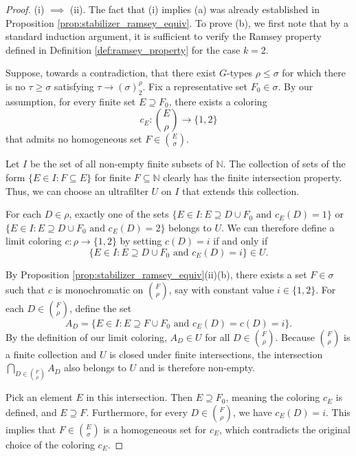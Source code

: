 \begin{proof}
    (i) $\implies$ (ii). The fact that (i) implies (a) was already established in Proposition \ref{prop:stabilizer_ramsey_equiv}. To prove (b), we first note that by a standard induction argument, it is sufficient to verify the Ramsey property defined in Definition \ref{def:ramsey_property} for the case $k=2$.

    Suppose, towards a contradiction, that there exist $G$-types $\rho \le \sigma$ for which there is no $\tau \ge \sigma$ satisfying $\tau \to (\sigma)^\rho_2$. Fix a representative set $F_0 \in \sigma$. By our assumption, for every finite set $E \supseteq F_0$, there exists a coloring
    $$
        c_E: \binom{E}{\rho} \to \{1, 2\}
    $$
    that admits no homogeneous set $F \in \binom{E}{\sigma}$.

    Let $I$ be the set of all non-empty finite subsets of $\mathbb{N}$. The collection of sets of the form $\{E \in I : F \subseteq E\}$ for finite $F \subseteq \mathbb{N}$ clearly has the finite intersection property. Thus, we can choose an ultrafilter $U$ on $I$ that extends this collection.

    For each $D \in \rho$, exactly one of the sets $\{E \in I : E \supseteq D \cup F_0 \text{ and } c_E(D) = 1\}$ or $\{E \in I : E \supseteq D \cup F_0 \text{ and } c_E(D) = 2\}$ belongs to $U$. We can therefore define a limit coloring $c: \rho \to \{1, 2\}$ by setting $c(D) = i$ if and only if
    $$
        \{E \in I : E \supseteq D \cup F_0 \text{ and } c_E(D) = i\} \in U.
    $$

    By Proposition \ref{prop:stabilizer_ramsey_equiv}(ii)(b), there exists a set $F \in \sigma$ such that $c$ is monochromatic on $\binom{F}{\rho}$, say with constant value $i \in \{1, 2\}$. For each $D \in \binom{F}{\rho}$, define the set
    $$
        A_D = \{E \in I : E \supseteq F \cup F_0 \text{ and } c_E(D) = c(D) = i\}.
    $$
    By the definition of our limit coloring, $A_D \in U$ for all $D \in \binom{F}{\rho}$. Because $\binom{F}{\rho}$ is a finite collection and $U$ is closed under finite intersections, the intersection $\bigcap_{D \in \binom{F}{\rho}} A_D$ also belongs to $U$ and is therefore non-empty.

    Pick an element $E$ in this intersection. Then $E \supseteq F_0$, meaning the coloring $c_E$ is defined, and $E \supseteq F$. Furthermore, for every $D \in \binom{F}{\rho}$, we have $c_E(D) = i$. This implies that $F \in \binom{E}{\sigma}$ is a homogeneous set for $c_E$, which contradicts the original choice of the coloring $c_E$.


\end{proof}
